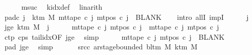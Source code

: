 \begin{isabellebody}
\ \ \ \ \isamarkupfalse%
\ m{}suc\ \isamarkupfalse%
\ k{\isacharunderscore}{\kern0pt}idx{\isacharunderscore}{\kern0pt}def\ \isamarkupfalse%
\ linarith\isanewline
\ \ \isamarkupfalse%
\ pad{\isacharunderscore}{\kern0pt}c{}{\isacharcolon}{\kern0pt}\ {\isachardoublequoteopen}{\isasymforall}j\ {\isasymge}\ k{\isacharunderscore}{\kern0pt}tm\ M{\isachardot}{\kern0pt}\ mt{\isacharunderscore}{\kern0pt}tape\ c{}\ j\ {\isacharparenleft}{\kern0pt}mt{\isacharunderscore}{\kern0pt}pos\ c{}\ j{\isacharparenright}{\kern0pt}\ {\isacharequal}{\kern0pt}\ BLANK{}{\isachardoublequoteclose}\isanewline
\ \ \isamarkupfalse%
\ {\isacharparenleft}{\kern0pt}intro\ allI\ impI{\isacharparenright}{\kern0pt}\isanewline
\ \ \ \ \isamarkupfalse%
\ j\ \isamarkupfalse%
\ jge{\isacharcolon}{\kern0pt}\ {\isachardoublequoteopen}k{\isacharunderscore}{\kern0pt}tm\ M\ {\isasymle}\ j{\isachardoublequoteclose}\isanewline
\ \ \ \ \isamarkupfalse%
\ {\isachardoublequoteopen}mt{\isacharunderscore}{\kern0pt}tape\ c{}\ j\ {\isacharparenleft}{\kern0pt}mt{\isacharunderscore}{\kern0pt}pos\ c{}\ j{\isacharparenright}{\kern0pt}\ {\isacharequal}{\kern0pt}\ mt{\isacharunderscore}{\kern0pt}tape\ c{}\ j\ {\isacharparenleft}{\kern0pt}mt{\isacharunderscore}{\kern0pt}pos\ c{}\ j{\isacharparenright}{\kern0pt}{\isachardoublequoteclose}\isanewline
\ \ \ \ \ \ \isamarkupfalse%
\ c{}{\isacharunderscore}{\kern0pt}tp\ c{}{\isacharunderscore}{\kern0pt}ps\ tail{\isacharunderscore}{\kern0pt}idx{\isacharbrackleft}{\kern0pt}OF\ jge{\isacharbrackright}{\kern0pt}\ \isamarkupfalse%
\ simp\isanewline
\ \ \ \ \isamarkupfalse%
\ {\isachardoublequoteopen}mt{\isacharunderscore}{\kern0pt}tape\ c{}\ j\ {\isacharparenleft}{\kern0pt}mt{\isacharunderscore}{\kern0pt}pos\ c{}\ j{\isacharparenright}{\kern0pt}\ {\isacharequal}{\kern0pt}\ BLANK{}{\isachardoublequoteclose}\ \isamarkupfalse%
\ pad{}\ jge\ \isamarkupfalse%
\ simp\isanewline
\ \ \isamarkupfalse%
\isanewline
\ \ \isamarkupfalse%
\ src{\isacharunderscore}{\kern0pt}c{}{\isacharcolon}{\kern0pt}\ {\isachardoublequoteopen}ar{\isacharunderscore}{\kern0pt}stage{\isacharunderscore}{\kern0pt}bounded\ {\isacharparenleft}{\kern0pt}bl{\isacharunderscore}{\kern0pt}tm\ M{\isacharparenright}{\kern0pt}\ {\isacharparenleft}{\kern0pt}k{\isacharunderscore}{\kern0pt}tm\ M{\isacharparenright}{\kern0pt}\isanewline

\end{isabellebody}
